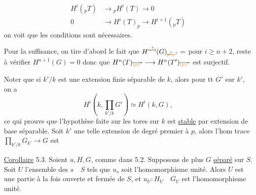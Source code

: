 \[
\begin{aligned}
H^i({}_pT)&\longrightarrow {}_pH^i(T)\longrightarrow 0\\
0&\longrightarrow H^i(T)_p\longrightarrow H^{i+1}({}_pT)
\end{aligned}
\]
on voit que les conditions sont nécessaires.

Pour la suffisance, on tire d'abord le fait que $H^{\deleted{\unsure{n}}i}(G)_{\deleted{\unsure{p}} \unsure{p}}=$ pour $i\geq n+2$, reste à vérifier $H^{n+1}(G)=0$ donc que $H^n(T)\deleted{{}_{\unsure{(p)}}}\longrightarrow H^n(T')\deleted{{}_{\unsure{(p)}}}$ est surjectif. 

Noter que si $k'/k$ est une extension finie séparable de $k$, alors pour tt $G'$ sur $k'$, on a
\[
H^i(k,\prod_{k'/k}G')\simeq H^i(k,G),
\]
ce qui prouve que l'hypothèse faite sur les tores sur $k$ est \uline{stable} par extension de base séparable. Soit $k'$ une telle extension de degré premier à $p$, alors l'hom trace $\prod_{k'/k}G_{k'}\longrightarrow G$ est  



\uline{Corollaire} 5.3. \quad Soient $u,H,G$, comme dans 5.2. Supposons de plus $G$ \uline{séparé} sur $S$. Soit $U$ l'ensemble des $s\quad S$ tels que $u_s$ soit l'homomorphisme unité. Alors $U$ est une partie à la fois ouverte et fermée de $S$, et $u_U:H_U\quad G_U$ est l'homomorphisme unité.

